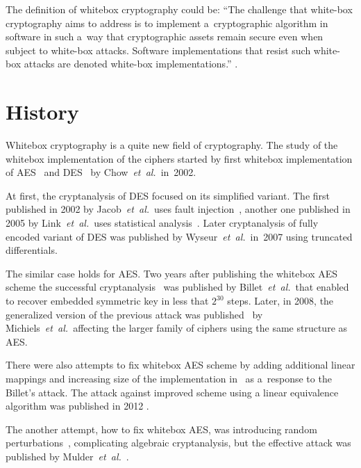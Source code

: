 \documentclass[11pt,oneside,final]{fithesis2}
\newcommand{\eal}{\emph{et~al.}}
\begin{document}
    The definition of whitebox cryptography could be:
    ``The challenge that white-box cryptography aims to address is to implement a~cryptographic algorithm in 
    software in such a~way that cryptographic assets remain secure even when subject to white-box attacks.
    Software implementations that resist such white-box attacks are denoted white-box implementations.'' \cite{hiding_keys}.
    
    \section{History}
    
    Whitebox cryptography is a quite new field of cryptography. The study of the whitebox implementation of the ciphers started by first 
    whitebox implementation of AES~\citep{Chow02white-boxcryptography} and DES~\citep{Chow02awhite-box} by Chow~\eal\ in~2002. 
    
    At first, the cryptanalysis of DES focused on its simplified variant. The first published in 2002 by Jacob~\eal\ 
    uses fault injection~\citep{conf/ccs/JacobBF02}, another one published in 2005 by Link~\eal\ uses statistical analysis~\citep{Link:2005:COI:1058430.1059147}.
    Later cryptanalysis of fully encoded variant of DES was published by Wyseur~\eal\ in~2007 using truncated differentials.
   
    The similar case holds for AES. Two years after publishing the whitebox AES scheme the successful cryptanalysis~\citep{Billet:2004:CWB:2080787.2080809} was
    published by Billet~\eal~that enabled to recover embedded symmetric 
    key in less that $2^{30}$ steps. Later, in 2008, the generalized version of the previous attack
    was published~\citep{Michiels:2007:MST:1314276.1314291} by Michiels~\eal\ affecting the larger family of ciphers using the same structure as AES.   
   
    There were also attempts to fix whitebox AES scheme by adding additional linear mappings and increasing size of the implementation in~\citep{XiaoLai}
    as a~response to the Billet's attack.
    The attack against improved scheme using a linear equivalence algorithm was published in 2012 \cite{conf/sacrypt/MulderRP12}.
    
    The another attempt, how to fix whitebox AES, was introducing random perturbations~\citep{journals/iacr/BringerCD06a}, 
    complicating algebraic cryptanalysis, but the effective attack was published by Mulder~\eal~\citep{conf/indocrypt/MulderWP10}.
    
\end{document}
